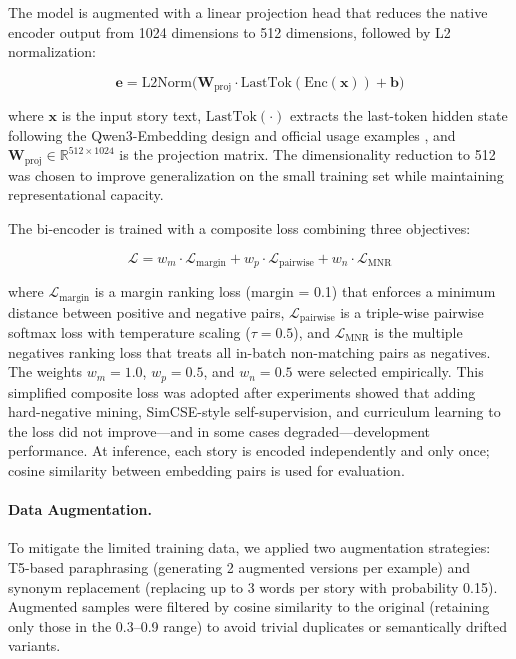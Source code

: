 \documentclass[11pt]{article}
\begin{document}
The model is augmented with a linear projection head that reduces the native encoder output from 1024 dimensions to 512 dimensions, followed by L2 normalization:

\begin{equation}
\mathbf{e} = \text{L2Norm}\bigl(\mathbf{W}_{\text{proj}} \cdot \text{LastTok}(\text{Enc}(\mathbf{x})) + \mathbf{b}\bigr)
\end{equation}

\noindent where $\mathbf{x}$ is the input story text, $\text{LastTok}(\cdot)$ extracts the last-token hidden state following the Qwen3-Embedding design and official usage examples \cite{qwen3-embedding}, and $\mathbf{W}_{\text{proj}} \in \mathbb{R}^{512 \times 1024}$ is the projection matrix. The dimensionality reduction to 512 was chosen to improve generalization on the small training set while maintaining representational capacity.

The bi-encoder is trained with a composite loss combining three objectives:

\begin{equation}
\mathcal{L} = w_m \cdot \mathcal{L}_{\text{margin}} + w_p \cdot \mathcal{L}_{\text{pairwise}} + w_n \cdot \mathcal{L}_{\text{MNR}}
\end{equation}

\noindent where $\mathcal{L}_{\text{margin}}$ is a margin ranking loss (margin = 0.1) that enforces a minimum distance between positive and negative pairs, $\mathcal{L}_{\text{pairwise}}$ is a triple-wise pairwise softmax loss with temperature scaling ($\tau = 0.5$), and $\mathcal{L}_{\text{MNR}}$ is the multiple negatives ranking loss \cite{henderson-etal-2017} that treats all in-batch non-matching pairs as negatives. The weights $w_m = 1.0$, $w_p = 0.5$, and $w_n = 0.5$ were selected empirically. This simplified composite loss was adopted after experiments showed that adding hard-negative mining, SimCSE-style self-supervision, and curriculum learning to the loss did not improve---and in some cases degraded---development performance. At inference, each story is encoded independently and only once; cosine similarity between embedding pairs is used for evaluation.

\paragraph{Data Augmentation.} To mitigate the limited training data, we applied two augmentation strategies: T5-based paraphrasing (generating 2 augmented versions per example) and synonym replacement (replacing up to 3 words per story with probability 0.15). Augmented samples were filtered by cosine similarity to the original (retaining only those in the 0.3--0.9 range) to avoid trivial duplicates or semantically drifted variants.
\end{document}
